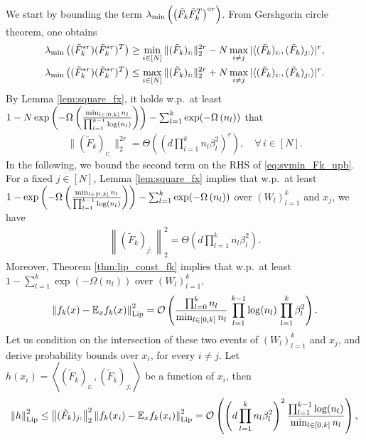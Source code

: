 \documentclass[11pt]{article}
\newcommand{\revision}[1]{#1}
\newcommand{\E}{\mathbb{E}}
\newcommand{\bigO}[1]{\mathcal{O}\left(#1\right)}
\newcommand{\bigOmg}[1]{\Omega\left(#1\right)}
\newcommand{\bigTheta}[1]{\Theta\left(#1\right)}
\newcommand{\inner}[1]{\left\langle#1\right\rangle}
\newcommand{\bigexp}[1]{\exp\left(#1\right)}
\newcommand{\norm}[1]{\left\|#1\right\|}
\newcommand{\evmin}[1]{\lambda_{\rm min}\left(#1\right)}
\def\Lip{\mathrm{Lip}}
\def\min{\mathop{\rm min}\nolimits}
\def\max{\mathop{\rm max}\nolimits}
\begin{document}
\revision{We start by bounding the term $\evmin{\left(\tilde F_{k} \tilde F_{k}^T\right)^{\circ r}}$.} From Gershgorin circle theorem, one obtains
    \begin{align}
	&\evmin{(\tilde{F}_{k}^{*r}) (\tilde{F}_{k}^{*r})^T}  \geq \min\limits_{i\in[N]} \|(\tilde{F}_k)_{i:}\|_2^{2r} - N \max\limits_{i\neq j} | \langle(\tilde{F}_{k})_{i:}, (\tilde{F}_{k})_{j:}\rangle |^r , \label{eq:svmin_Fk_lob} \\
	&\evmin{(\tilde{F}_{k}^{*r}) (\tilde{F}_{k}^{*r})^T} \leq \max\limits_{i\in[N]} \|(\tilde{F}_k)_{i:}\|_2^{2r} + N \max\limits_{i\neq j} | \langle(\tilde{F}_{k})_{i:}, (\tilde{F}_{k})_{j:}\rangle |^r . \label{eq:svmin_Fk_upb}
    \end{align}
    By Lemma \ref{lem:square_fx}, it holds w.p.\ at least $1-N\bigexp{ -\bigOmg{ \frac{\min_{l\in[0,k]} n_l}{\prod_{l=1}^{k-1}\log(n_l)} } } - \sum_{l=1}^{k}\exp(-\bigOmg{n_l})$ that
    \begin{align}\label{eq:svmin_diag}
	\|(\tilde{F}_k)_{i:}\|_2^{2r}
	= \bigTheta{ \left(d \prod_{l=1}^{k} n_l\beta_l^2\right)^{r} }, \quad\forall\,i\in[N].
    \end{align}
    In the following, we bound the second term on the RHS of \eqref{eq:svmin_Fk_upb}.
    For a fixed $j\in[N]$, Lemma \ref{lem:square_fx} implies that w.p.\ at least $1-\bigexp{ -\bigOmg{ \frac{\min_{l\in[0,k]} n_l}{\prod_{l=1}^{k-1}\log(n_l)} } } - \sum_{l=1}^{k}\exp(-\bigOmg{n_l})$
    over $(W_l)_{l=1}^k$ and $x_j$, we have
    \begin{align}\label{eq:event_Fkj}
	\norm{(\tilde{F}_k)_{j:}}_2^2 
	= \bigTheta{ d \prod_{l=1}^{k} n_l\beta_l^2 } .
    \end{align}
    Moreover, Theorem \ref{thm:lip_const_fk} implies that w.p.\ at least $1-\sum_{l=1}^{k}\bigexp{-\bigOmg{n_l}}$ over $(W_l)_{l=1}^{k},$
    \begin{align}\label{eq:event_lip_fk}
	\norm{f_k(x)-\E_x f_k(x)}_{\Lip}^2
	=\bigO{ \frac{\prod_{l=0}^k n_l}{\min_{l\in[0,k]}n_l}\, \prod_{l=1}^{k-1}\log(n_l)\, \prod_{l=1}^{k}\beta_l^2 } .
    \end{align}
    Let us condition on the intersection of these two events of $(W_l)_{l=1}^k$ and $x_j$, and derive probability bounds over $x_i$, for every $i\neq j.$
    Let $h(x_i)=\inner{(\tilde{F}_{k})_{i:}, (\tilde{F}_{k})_{j:}}$ be a function of $x_i$, then
    \begin{align*}
	\norm{h}_{\Lip}^2 
	\leq \norm{(\tilde{F}_{k})_{j:}}_2^2 \norm{f_k(x_i)-\E_x f_k(x_i)}_{\Lip}^2 
	=\bigO{\left(d\prod_{l=1}^{k}n_l\beta_l^2\right)^2  \frac{\prod_{l=1}^{k-1}\log(n_l)}{\min_{l\in[0,k]}n_l} } ,
    \end{align*}
\end{document}
